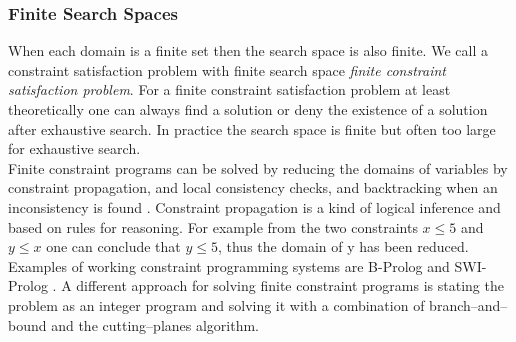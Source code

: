\subsubsection{Finite Search Spaces}
When each domain is a finite set then the search space is also finite. We call a constraint satisfaction problem with finite search space \emph{finite constraint satisfaction problem}. For a finite constraint satisfaction problem at least theoretically one can always find a solution or deny the existence of a solution after exhaustive search. In practice the search space is finite but often too large for exhaustive search.\\
Finite constraint programs can be solved by reducing the domains of variables by constraint propagation, and local consistency checks, and backtracking when an inconsistency is found \cite{ConstraintPropagation}. Constraint propagation is a kind of logical inference and based on rules for reasoning. For example from the two constraints $x\leq 5$ and $y \leq x$ one can conclude that $y\leq 5$, thus the domain of y has been reduced. Examples of working constraint programming systems are B-Prolog and SWI-Prolog \cite{citation needed}. %
A different approach for solving finite constraint programs is stating the problem as an integer program and solving it with a combination of branch--and--bound and the cutting--planes algorithm.

